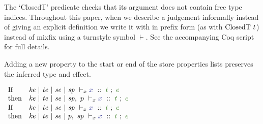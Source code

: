 \smallskip\noindent
The `ClosedT' predicate checks that its argument does not contain free type indices. Throughout this paper, when we describe a judgement informally instead of giving an explicit definition we write it with in prefix form (as with $\textrm{ClosedT}~ t$) instead of mixfix using a turnstyle symbol $\vdash$. See the accompanying Coq script for full details. 
\qqed


\begin{lemma}
Adding a new property to the start or end of the store properties lists preserves the inferred type and effect.
\end{lemma}

$
\begin{array}{lll}
    \pIf        & \TypeX{\mke}{\mte}{\mse}{\msp}      {x}{t}{e}     \\
    \pthen      & \TypeX{\mke}{\mte}{\mse}{\msp,~ p}  {x}{t}{e}
\end{array}
$
\quad
$
\begin{array}{lll}
    \pIf        & \TypeX{\mke}{\mte}{\mse}{\msp}      {x}{t}{e}       \\
    \pthen      & \TypeX{\mke}{\mte}{\mse}{p,~ \msp}  {x}{t}{e}
\end{array}
$
\qqed




